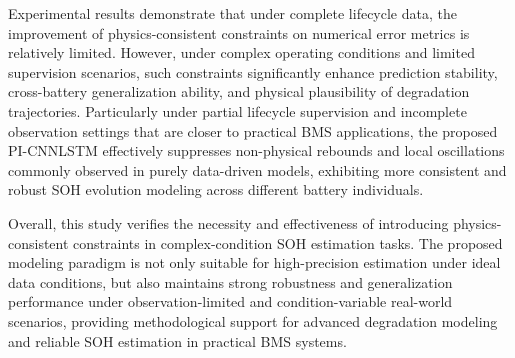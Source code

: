 \documentclass[a4paper,fleqn]{cas-dc}
\begin{document}
Experimental results demonstrate that under complete lifecycle data, the improvement of physics-consistent constraints on numerical error metrics is relatively limited. However, under complex operating conditions and limited supervision scenarios, such constraints significantly enhance prediction stability, cross-battery generalization ability, and physical plausibility of degradation trajectories. Particularly under partial lifecycle supervision and incomplete observation settings that are closer to practical BMS applications, the proposed PI-CNNLSTM effectively suppresses non-physical rebounds and local oscillations commonly observed in purely data-driven models, exhibiting more consistent and robust SOH evolution modeling across different battery individuals.

Overall, this study verifies the necessity and effectiveness of introducing physics-consistent constraints in complex-condition SOH estimation tasks. The proposed modeling paradigm is not only suitable for high-precision estimation under ideal data conditions, but also maintains strong robustness and generalization performance under observation-limited and condition-variable real-world scenarios, providing methodological support for advanced degradation modeling and reliable SOH estimation in practical BMS systems.

\printcredits




\end{document}
